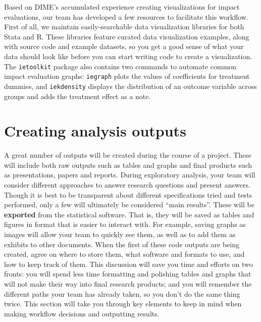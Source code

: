Based on DIME's accumulated experience creating visualizations for impact evaluations,
our team has developed a few resources to facilitate this workflow.
First of all, we maintain easily-searchable data visualization libraries for both Stata and R.
These libraries feature curated data visualization examples, along with source code and example datasets,
so you get a good sense of what your data should look like
before you can start writing code to create a visualization.
The \texttt{ietoolkit} package also contains two commands to automate
common impact evaluation graphs:
\texttt{iegraph}
plots the values of coefficients for treatment dummies,
and \texttt{iekdensity} displays the distribution of an outcome variable
across groups and adds the treatment effect as a note.



\section{Creating analysis outputs}

A great number of outputs will be created during the course of a project.
These will include both raw outputs such as tables and graphs
and final products such as presentations, papers and reports.
During exploratory analysis, your team will consider different approaches
to answer research questions and present answers.
Though it is best to be transparent about different
specifications tried and tests performed,
only a few will ultimately be considered ``main results''.
These will be \textbf{exported}
from the statistical software.
That is, they will be saved as tables and figures in format that is easier to interact with.
For example, saving graphs as images will allow your team to quickly see them,
as well as to add them as exhibits to other documents.
When the first of these code outputs are being created, agree on where to store them,
what software and formats to use, and how to keep track of them.
This discussion will save you time and efforts on two fronts:
you will spend less time formatting and polishing tables and graphs that
will not make their way into final research products;
and you will remember the different paths your team has already
taken, so you don't do the same thing twice.
This section will take you through key elements to keep in mind
when making workflow decisions and outputting results.



